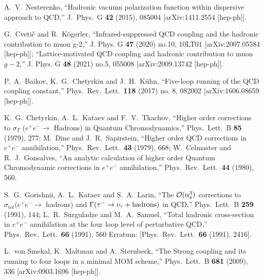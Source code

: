 \documentclass[aps,nofootinbib,showkeys,noshowpacs,preprintnumbers,amsmath,amssymb]{revtex4}
\begin{document}
\begin{thebibliography}{99}
A.~V.~Nesterenko,
  ``Hadronic vacuum polarization function within dispersive approach to QCD,''
  J.\ Phys.\ G {\bf 42} (2015), 085004
  [arXiv:1411.2554 [hep-ph]].
  
G.~Cveti\v{c} and R.~K\"ogerler,
``Infrared-suppressed QCD coupling and the hadronic contribution to muon g-2,''
J. Phys. G \textbf{47} (2020) no.10, 10LT01
[arXiv:2007.05584 [hep-ph]];
``Lattice-motivated QCD coupling and hadronic contribution to muon $g-2$,''
J. Phys. G \textbf{48} (2021) no.5, 055008
[arXiv:2009.13742 [hep-ph]].
  
  P.~A.~Baikov, K.~G.~Chetyrkin and J.~H.~K\"uhn,
  ``Five-loop running of the QCD coupling constant,''
 Phys.\ Rev.\ Lett.\  {\bf 118} (2017) no. 8, 082002
  [arXiv:1606.08659 [hep-ph]].

  
  K.~G.~Chetyrkin, A.~L.~Kataev and F.~V.~Tkachov,
``Higher order corrections to $\sigma_T$ ($e^+ e^- \to$ Hadrons) 
in Quantum Chromodynamics,''
 Phys.\ Lett.\ B {\bf 85} (1979), 277;
  M.~Dine and J.~R.~Sapirstein,
  ``Higher order QCD corrections in $e^+e^-$ annihilation,''
  Phys.\ Rev.\ Lett.\  {\bf 43} (1979), 668;
  W.~Celmaster and R.~J.~Gonsalves,
``An analytic calculation of higher order Quantum Chromodynamic 
corrections in  $e^+e^-$ annihilation,''
  Phys.\ Rev.\ Lett.\  {\bf 44} (1980), 560.
 
  S.~G.~Gorishnii, A.~L.~Kataev and S.~A.~Larin,
``The ${\cal O}(\alpha_s^3)$ corrections to $\sigma_{tot} (e^+ e^- \to$ hadrons) and 
$\Gamma(\tau^- \to \nu_{\tau} + {\rm hadrons})$ in QCD,''
 Phys.\ Lett.\ B {\bf 259} (1991), 144;
  L.~R.~Surguladze and M.~A.~Samuel,
``Total hadronic cross-section in $e^+e^-$ annihilation 
at the four loop level of perturbative QCD,''
 Phys.\ Rev.\ Lett.\  {\bf 66} (1991), 560
  Erratum: [Phys.\ Rev.\ Lett.\  {\bf 66} (1991), 2416].

  L.~von Smekal, K.~Maltman and A.~Sternbeck,
  ``The Strong coupling and its running to four loops in a minimal MOM scheme,''
  Phys.\ Lett.\ B {\bf 681} (2009), 336
  [arXiv:0903.1696 [hep-ph]].


\end{thebibliography}
\end{document}
